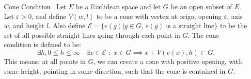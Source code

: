 \begin{defn}{Cone Condition}~\label{def:cone_condition}
    Let $E$ be a Euclidean space and let $G$ be an open subset of $E$.
    Let $\varepsilon >0$, and define 
    $V(w, l)$ to be a cone with vertex at origo, opening $\varepsilon$, axis $w$,
    and height $l$.
    Also define $\mathcal{E} = \{e(g) | g \in G, \, e(g) \text{ is a straight line}\}$ 
    to be the set of all possible straight lines going through each point in $G$. %
    The cone condition is defined to be:
    \begin{equation*}
        \exists h, 0\leq h \leq \infty \quad
        \exists e\in \mathcal{E} \,\, : \,\,  x \in G \implies 
        x + V(e(x), h) \subset G. %
    \end{equation*}
    This means: at all points in $G$, we can create a cone with positive opening,
    with some height, pointing in some direction, such that the cone is contained 
    in $G$.
\end{defn}
\begin{figure}[H]
    \center
    
    
\end{figure}



